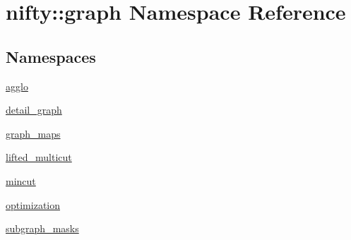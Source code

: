 \hypertarget{namespacenifty_1_1graph}{}\section{nifty\+:\+:graph Namespace Reference}
\label{namespacenifty_1_1graph}
\subsection*{Namespaces}
\begin{DoxyCompactItemize}
\item 
 \hyperlink{namespacenifty_1_1graph_1_1agglo}{agglo}
\item 
 \hyperlink{namespacenifty_1_1graph_1_1detail__graph}{detail\+\_\+graph}
\item 
 \hyperlink{namespacenifty_1_1graph_1_1graph__maps}{graph\+\_\+maps}
\item 
 \hyperlink{namespacenifty_1_1graph_1_1lifted__multicut}{lifted\+\_\+multicut}
\item 
 \hyperlink{namespacenifty_1_1graph_1_1mincut}{mincut}
\item 
 \hyperlink{namespacenifty_1_1graph_1_1optimization}{optimization}
\item 
 \hyperlink{namespacenifty_1_1graph_1_1subgraph__masks}{subgraph\+\_\+masks}
\end{DoxyCompactItemize}

